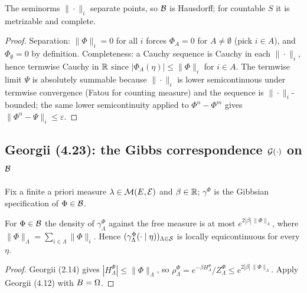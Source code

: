 \begin{proposition}
    \label{prop:exg-b-frechet}
    \leanok

    The seminorms $\|\cdot\|_i$ separate points, so $\mathcal{B}$ is Hausdorff; for countable $S$
    it is metrizable and complete.
\end{proposition}
\begin{proof}
    \leanok

    Separation: $\|\Phi\|_i=0$ for all $i$ forces $\Phi_A=0$ for $A\neq\emptyset$ (pick
    $i\in A$), and $\Phi_\emptyset=0$ by definition. Completeness: a Cauchy sequence is Cauchy
    in each $\|\cdot\|_i$, hence termwise Cauchy in $\mathbb{R}$ since $|\Phi_A(\eta)|\le\|\Phi\|_i$
    for $i\in A$. The termwise limit $\Psi$ is absolutely summable because $\|\cdot\|_i$ is
    lower semicontinuous under termwise convergence (Fatou for counting measure) and the
    sequence is $\|\cdot\|_i$-bounded; the same lower semicontinuity applied to
    $\Phi^n-\Phi^m$ gives $\|\Phi^n-\Psi\|_i\le\varepsilon$.
\end{proof}

\subsection*{Georgii (4.23): the Gibbs correspondence $\mathcal{G}(\cdot)$ on $\mathcal{B}$}

Fix a finite a priori measure $\lambda\in\mathcal{M}(E,\mathcal E)$ and $\beta\in\mathbb{R}$; $\gamma^\Phi$
is the Gibbsian specification of $\Phi\in\mathcal{B}$.

\begin{lemma}
    \label{lem:exg-4-14-1}
    \leanok

    For $\Phi\in\mathcal{B}$ the density of $\gamma^\Phi_\Lambda$ against the free measure is at
    most $e^{2|\beta|\,\|\Phi\|_\Lambda}$, where $\|\Phi\|_\Lambda = \sum_{i\in\Lambda}\|\Phi\|_i$.
    Hence $(\gamma^\Phi_\Lambda(\cdot\mid\eta))_{\Lambda\in\mathcal{S}}$ is locally equicontinuous
    for every $\eta$.
\end{lemma}
\begin{proof}
    \leanok

    Georgii (2.14) gives $|H^\Phi_\Lambda|\le\|\Phi\|_\Lambda$, so
    $\rho^\Phi_\Lambda = e^{-\beta H^\Phi_\Lambda}/Z^\Phi_\Lambda
    \le e^{2|\beta|\,\|\Phi\|_\Lambda}$. Apply Georgii (4.12) with $B=\Omega$.
\end{proof}

